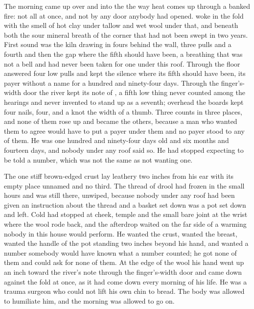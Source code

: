 
The morning came up over  and into the  the way heat comes up through a banked fire: not all at once, and not by any door anybody had opened.  woke in the fold with the smell of hot clay under tallow and wet wool under that, and beneath both the sour mineral breath of the corner that had not been swept in two years. First sound was the kiln drawing in fours behind the wall, three pulls and a fourth and then the gap where the fifth should have been, a breathing that was not a bell and had never been taken for one under this roof. Through the floor  answered four low pulls and kept the silence where its fifth should have been, its payer without a name for a hundred and ninety-four days. Through the finger's-width door the river kept its note of , a fifth low thing never counted among the hearings and never invented to stand up as a seventh; overhead the boards kept four nails, four, and a knot the width of a thumb. Three counts in three places, and none of them rose up and became the others, because a man who wanted them to agree would have to put a payer under them and no payer stood to any of them. He was one hundred and ninety-four days old and six months and fourteen days, and nobody under any roof said so. He had stopped expecting to be told a number, which was not the same as not wanting one.

The one stiff brown-edged crust lay leathery two inches from his ear with its empty place unnamed and no third. The thread of drool had frozen in the small hours and was still there, unwiped, because nobody under any roof had been given an instruction about the thread and a basket set down was a pot set down and left. Cold had stopped at cheek, temple and the small bare joint at the wrist where the wool rode back, and the afterdrop waited on the far side of a warming nobody in this house would perform. He wanted the crust, wanted the breast, wanted the handle of the pot standing two inches beyond his hand, and wanted a number somebody would have known what a number counted; he got none of them and could ask for none of them. At the edge of the wool his hand went up an inch toward the river's note through the finger's-width door and came down against the fold at once, as it had come down every morning of his life. He was a trauma surgeon who could not lift his own chin to bread. The body was allowed to humiliate him, and the morning was allowed to go on.

